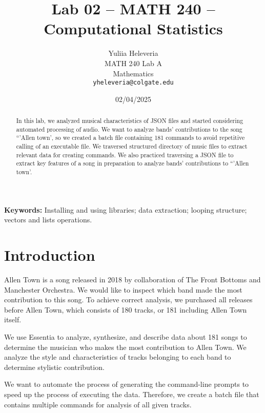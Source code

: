 \documentclass{article}\usepackage[]{graphicx}\usepackage[]{xcolor}
\begin{document}
\vspace{-1in}
\title{Lab 02 -- MATH 240 -- Computational Statistics}

\author{
  Yuliia Heleveria \\
  MATH 240 Lab A  \\
  Mathematics  \\
  {\tt yheleveria@colgate.edu}
}

\date{02/04/2025}

\maketitle

\begin{multicols}{2}
\begin{abstract}
In this lab, we analyzed musical characteristics of JSON files and started considering automated processing of audio. We want to analyze bands' contributions to the song ``'Allen town', so we created a batch file containing 181 commands to avoid repetitive calling of an executable file. We traversed structured directory of music files to extract relevant data for creating commands. We also practiced traversing a JSON file to extract key features of a song in preparation to analyze bands' contributions to  ``'Allen town'.
\end{abstract}

\noindent \textbf{Keywords:} Installing and using libraries; data extraction; looping structure; vectors and lists operations.

\section{Introduction}

Allen Town is a song released in 2018 by collaboration of The Front Bottoms and Manchester Orchestra. We would like to inspect which band made the most contribution to this song. To achieve correct analysis, we purchased all releases before Allen Town, which consists of 180 tracks, or 181 including Allen Town itself.

We use Essentia to analyze, synthesize, and describe data about 181 songs to determine the musician who makes the most contribution to Allen Town. We analyze the style and characteristics of tracks belonging to each band to determine stylistic contribution. 

We want to automate the process of generating the command-line prompts to speed up the process of executing the data. Therefore, we create a batch file that contains multiple commands for analysis of all given tracks.


\end{multicols}
\end{document}

